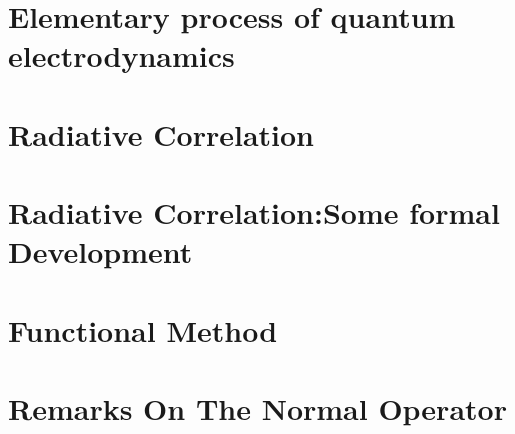 \section{Elementary process of quantum electrodynamics}


\section{Radiative Correlation}


\section{Radiative Correlation:Some formal Development}


\section{Functional Method}


\clearpage
\section{Remarks On The Normal Operator}


\clearpage
